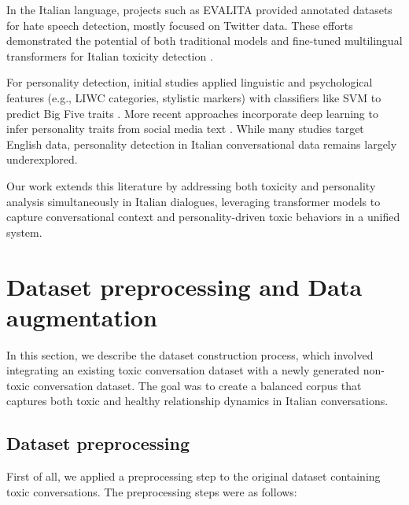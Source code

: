 \documentclass[conference]{IEEEtran}
\begin{document}
In the Italian language, projects such as EVALITA \cite{EVALITA2018} provided annotated datasets for hate speech detection, mostly focused on Twitter data. These efforts demonstrated the potential of both traditional models and fine-tuned multilingual transformers for Italian toxicity detection \cite{ResourcesBenchmarkHateSpeech2021}.

For personality detection, initial studies applied linguistic and psychological features (e.g., LIWC categories, stylistic markers) with classifiers like SVM to predict Big Five traits \cite{PersonalityRecognitionConversationText2007} \cite{WhoseThumb2006}. More recent approaches incorporate deep learning to infer personality traits from social media text \cite{PersonalityTraitDetectionBERT2020}. While many studies target English data, personality detection in Italian conversational data remains largely underexplored.

Our work extends this literature by addressing both toxicity and personality analysis simultaneously in Italian dialogues, leveraging transformer models to capture conversational context and personality-driven toxic behaviors in a unified system.

\section{Dataset preprocessing and Data augmentation}

In this section, we describe the dataset construction process, which involved integrating an existing toxic conversation dataset with a newly generated non-toxic conversation dataset. The goal was to create a balanced corpus that captures both toxic and healthy relationship dynamics in Italian conversations.

\subsection{Dataset preprocessing}

First of all, we applied a preprocessing step to the original dataset containing toxic conversations. The preprocessing steps were as follows:
\end{document}
